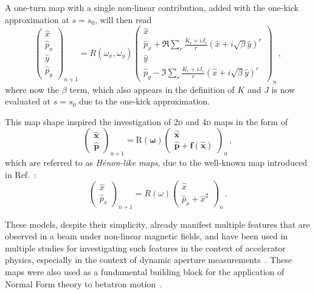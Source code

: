 A one-turn map with a single non-linear contribution, added 
with the one-kick approximation at $s = s_0$, will then read  
\begin{equation}
	\begin{pmatrix}
		\hat x \\ \hat p_x \\ \hat y \\ \hat p_y 
	\end{pmatrix}_{n+1}
	=
	R(\omega_x,\omega_y)
	\begin{pmatrix}
		\hat x \\ \hat p_x + \Re \sum_r\frac{K_r + iJ_r}{r}(\hat x+ i\sqrt{\beta}\hat y)^r \\ \hat y \\ \hat p_y - \Im \sum_r\frac{K_r + iJ_r}{r}(\hat x+ i\sqrt{\beta}\hat y)^r  
	\end{pmatrix}_{n}\,,
\end{equation}
where now the $\beta$ term, which also appears in the definition of $K$ and $J$ is now evaluated at $s=s_0$ due to the one-kick approximation.

This map shape inspired the investigation of 2\textsc{d} and 4\textsc{d} maps in the form of
\begin{equation}
	\begin{pmatrix}
		\hat{\mathbf{x}} \\ \hat{\mathbf{p}}  
	\end{pmatrix}_{n+1}
	=
	\mathrm{R}(\bm\omega)
		\begin{pmatrix}
			\hat{\mathbf{x}} \\ \hat{\mathbf{p}} + \mathbf{f}(\hat{\mathbf{x}})
	\end{pmatrix}_{n} \,,
	\label{eq:henonlike}
\end{equation}
which are referred to as \textit{Hénon-like maps}, due to the well-known map introduced in Ref.~\cite{henon}:
%
\begin{equation}
	\begin{pmatrix}
		\hat x \\ \hat p_x
	\end{pmatrix}_{n+1}
	=
	R(\omega)
		\begin{pmatrix}
			\hat x \\ \hat p_x + \hat x^2
	\end{pmatrix}_{n} \,.
	\label{eq:simplehenon}
\end{equation}

These models, despite their simplicity, already manifest multiple features that are observed in a beam under non-linear magnetic fields, and have been used in multiple studies for investigating such features in the context of accelerator physics, especially in the context of dynamic aperture measurements~\cite{PhysRevE.53.4067, invlog}. These maps were also used as a fundamental building block for the application of Normal Form theory to betatron motion~\cite{bazzani1994normal}.


